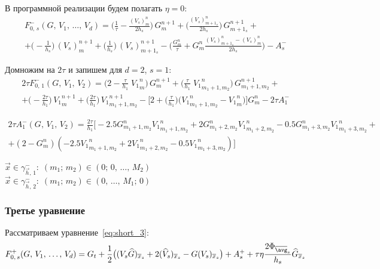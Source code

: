 В программной реализации будем полагать $\eta = 0$:
\begin{multline*}
F_{0, \, s}^- (G, \, V_1, \, \ldots, \, V_d) = 
\bigg( \frac{1}{\tau} - \frac{(V_s)^n_m}{2 h_s} \bigg) \, G^{n+1}_m
+
\bigg( \frac{(V_s)^n_{m + 1_s}}{2 h_s} \bigg) \, G^{n+1}_{m + 1_s}
+ \\ +
\bigg( - \frac{1}{h_s} \bigg) \, (V_s)^{n+1}_m
+
\bigg(   \frac{1}{h_s} \bigg) \, (V_s)^{n+1}_{m + 1_s}
-
\bigg( \frac{G^n_m}{\tau} + G^n_m \frac{(V_s)^n_{m + 1_s} - (V_s)^n_m}{2 h_s} \bigg) - A_{s}^-
\end{multline*}

Домножим на $2\tau$ и запишем для $d=2$, $s=1$:
\begin{multline*}
2\tau F_{0, \, 1}^- (G, \, V_1, \, V_2) = 
\bigg( 2 - \frac{\tau}{h_1} \; {V_1}^n_m \bigg) \, G^{n+1}_m
+ \bigg(   \frac{\tau}{h_1} \; {V_1}^n_{m_1 + 1, m_2} \bigg) \, G^{n+1}_{m_1 + 1, m_2}
+ \\ +
  \bigg( - \frac{2\tau}{h_1} \bigg) \, {V_1}^{n+1}_m
+ \bigg(   \frac{2\tau}{h_1} \bigg) \, {V_1}^{n+1}_{m_1 + 1, m_2}
- \bigg[ 2  
   + \bigg( \frac{\tau}{h_1} \bigg) \bigg( {V_1}^n_{m_1 + 1, m_2} - {V_1}^n_m \bigg)
  \bigg] G^n_m - 2\tau A_{1}^-
\end{multline*}

\begin{multline*}
2\tau A_{1}^- (G, \, V_1, \, V_2) = \frac{2\tau}{h_1}
\bigg[ - 2.5 G^{n}_{m_1 + 1, m_2} {V_1}^{n}_{m_1 + 1, m_2} 
       + 2   G^{n}_{m_1 + 2, m_2} {V_1}^{n}_{m_1 + 2, m_2} 
       - 0.5 G^{n}_{m_1 + 3, m_2} {V_1}^{n}_{m_1 + 3, m_2} 
+ \\ + (2 - G^{n}_{m}) (
   	   - 2.5 {V_1}^{n}_{m_1 + 1, m_2} 
       + 2   {V_1}^{n}_{m_1 + 2, m_2} 
       - 0.5 {V_1}^{n}_{m_1 + 3, m_2} 
) \bigg]
\end{multline*}

$\vec{x} \in \gamma_{\vec{h}, \, 1}^-:\; (m_1; \, m_2) \in (0; \, 0, \, \ldots, \, M_2)$ \\
$\vec{x} \in \gamma_{\vec{h}, \, 2}^-:\; (m_1; \, m_2) \in (0, \, \ldots, \, M_1; \, 0)$



\subsubsection{Третье уравнение}
Рассматриваем уравнение~\eqref{eq:short_3}: 
\begin{equation*}
F_{0, \, s}^+ (G, \, V_1, \, \ldots, \, V_d) = G_t 
+ \frac{1}{2} \big( (V_s \widehat{G})_{\overline{x}_s} + 2 (\widehat{V}_s)_{\overline{x}_s} - G (V_s)_{\overline{x}_s} \big)
+ A_{s}^+ + \tau \eta \frac{2 \Phi_{\overline{\avg}_s}}{h_s} \widehat{G}_{\overline{x}_s}
\end{equation*}

